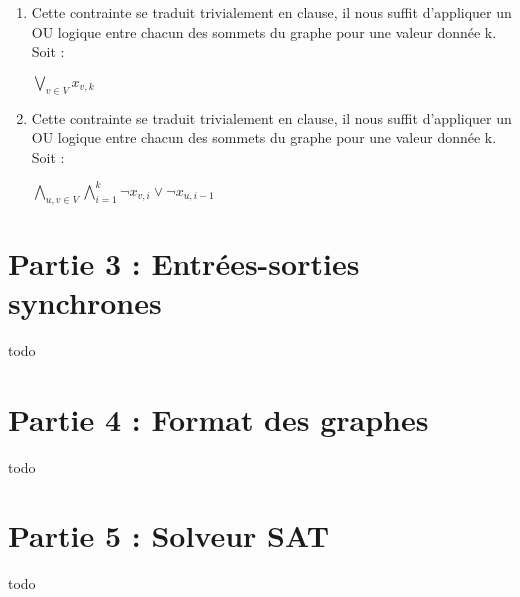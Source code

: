 \documentclass[a4paper]{article}
\begin{document}
\begin{enumerate}
\item
Cette contrainte se traduit trivialement en clause, il nous suffit d'appliquer 
un OU logique entre chacun des sommets du graphe pour une valeur donnée k.
Soit : \\
\begin{center}
$\bigvee\limits_{v∈V}^{} x_{v,k} $
\end{center}

\item
Cette contrainte se traduit trivialement en clause, il nous suffit d'appliquer 
un OU logique entre chacun des sommets du graphe pour une valeur donnée k.
Soit : \\
\begin{center}
$\bigwedge\limits_{u,v∈V}^{} \bigwedge\limits_{i=1}^{k} \neg x_{v,i} \vee \neg x_{u,i-1}$
\end{center}

\end{enumerate}

\section{Partie 3 : Entrées-sorties synchrones}

todo


\section{Partie 4 : Format des graphes}

todo


\section{Partie 5 : Solveur SAT}

todo

\end{document}
